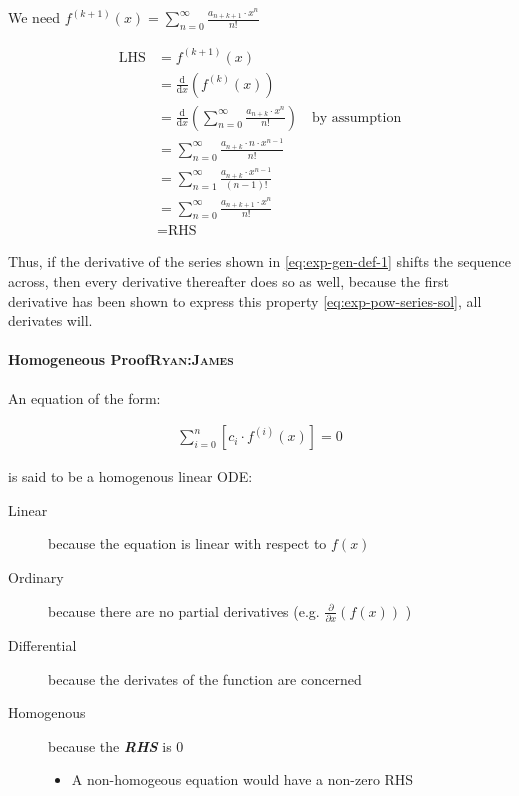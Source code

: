 \documentclass[11pt]{article}
\begin{document}
We need \(f^{(k+1)}(x) = \sum_{n=0}^\infty\frac{a_{n+k+1}\cdot x^n}{n!}\)

\begin{align*}
    \text{LHS} &= f^{(k+1)}(x)\\
    &= \frac{\mathrm{d}}{\mathrm{d}x}\left(f^{(k)}(x)\right)\\
    &= \frac{\mathrm{d}}{\mathrm{d}x}\left(\sum_{n=0}^\infty\frac{a_{n+k}\cdot x^n}{n!}\right)\quad \text{by assumption}\\
    &= \sum_{n=0}^\infty\frac{a_{n+k}\cdot n\cdot x^{n-1}}{n!}\\
    &= \sum_{n=1}^\infty\frac{a_{n+k}\cdot x^{n-1}}{(n-1)!}\\
    &= \sum_{n=0}^\infty\frac{a_{n+k+1}\cdot x^{n}}{n!}\\
    &= \text{RHS}
\end{align*}

Thus, if the derivative of the series shown in \eqref{eq:exp-gen-def-1} shifts the
sequence across, then every derivative thereafter does so as well, because the
first derivative has been shown to express this property
\eqref{eq:exp-pow-series-sol}, all derivates will.

\paragraph{Homogeneous Proof\hfill{}\textsc{Ryan:James}}
\label{sec:orga85be11}
An equation of the form:

\begin{align}
\sum^{n}_{i=0} \left[ c_{i} \cdot f^{(i)}(x) \right] = 0 \label{eq:hom-ode}
\end{align}

is said to be a homogenous linear ODE: \cite[Ch. 2]{zillDifferentialEquations2009a}

\begin{description}
\item[{Linear}] because the equation is linear with respect to \(f(x)\)
\item[{Ordinary}] because there are no partial derivatives (e.g. \(\frac{\partial }{\partial x}{\left({ f{\left({ x }\right)} }\right)}\)  )
\item[{Differential}] because the derivates of the function are concerned
\item[{Homogenous}] because the \textbf{\emph{RHS}} is 0
\begin{itemize}
\item A non-homogeous equation would have a non-zero RHS
\end{itemize}
\end{description}
\end{document}

